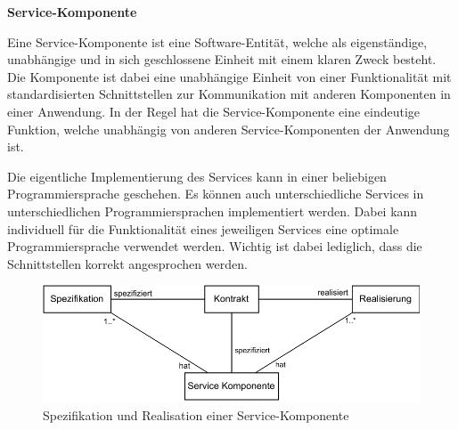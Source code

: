 

\textbf{Service-Komponente}


Eine Service-Komponente ist eine Software-Entität, welche als eigenständige, unabhängige und in sich geschlossene Einheit mit einem klaren Zweck besteht. Die Komponente ist dabei eine unabhängige Einheit von einer Funktionalität mit standardisierten Schnittstellen zur Kommunikation mit anderen Komponenten in einer Anwendung. In der Regel hat die Service-Komponente eine eindeutige Funktion, welche unabhängig von anderen Service-Komponenten der Anwendung ist.

Die eigentliche Implementierung des Services kann in einer beliebigen Programmiersprache geschehen. Es können auch unterschiedliche Services in unterschiedlichen Programmiersprachen implementiert werden. Dabei kann individuell für die Funktionalität eines jeweiligen Services eine optimale Programmiersprache verwendet werden. Wichtig ist dabei lediglich, dass die Schnittstellen korrekt angesprochen werden.   



\begin{figure}[H]
    \centering
    \includegraphics[width=1.\textwidth]{images/Spezifikation-Realisation-Service.drawio.pdf}
    \caption{Spezifikation und Realisation einer Service-Komponente \cite{Stojanovic.op.2004}}
    \label{fig:specification-realisation}
\end{figure}

